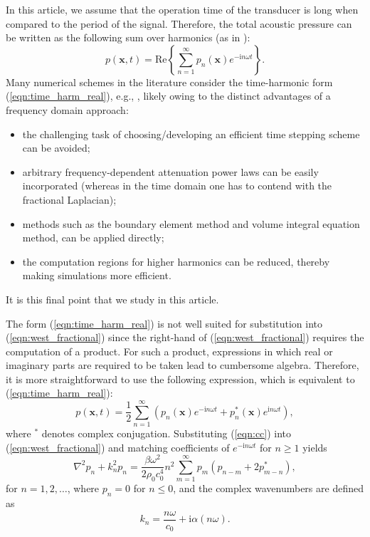 \documentclass[11pt]{article}
\numberwithin{equation}{section}
\newcommand{\bx}{\mathbf{x}}
\newcommand{\red}[1]{{\color{black} #1}}
\begin{document}
In this article, we assume that the operation time of the transducer is long
when compared to the period of the signal. Therefore, the total acoustic 
pressure can be written as the following sum over harmonics 
(as in \cite{du2013fast,soneson2017extending}):
\red{
\begin{equation}
    p(\bx, t) = \text{Re} \left\{\sum_{n=1}^{\infty} 
        p_n(\bx)e^{-\text{i}n\omega t}\right\}.
    \label{eqn:time_harm_real}
\end{equation}
} 
Many numerical schemes in the literature consider the time-harmonic form 
(\ref{eqn:time_harm_real}), e.g., \cite{campos1999finite, du2013fast,soneson2017extending,
van2015fast}, likely owing to the distinct advantages of a frequency domain 
approach:
\begin{itemize}
    \item the challenging task of choosing/developing an efficient time stepping 
    scheme can be avoided; 
    \item arbitrary frequency-dependent attenuation power laws can be easily incorporated
    (whereas in the time domain one has to contend with the fractional Laplacian);
    \item methods such as the boundary element method 
    and volume integral equation method, can be applied directly;
    \item the computation regions for higher harmonics can 
    be reduced, thereby making simulations more efficient.
\end{itemize}
It is this final point that we study in this article.
    
The form (\ref{eqn:time_harm_real}) is not well suited for 
substitution into (\ref{eqn:west_fractional}) 
since the right-hand of (\ref{eqn:west_fractional}) requires the computation of 
a product. For such a product, expressions in which real or imaginary parts are 
required to be taken lead to cumbersome algebra. Therefore, it is more 
straightforward to use the following expression, which is equivalent to 
(\ref{eqn:time_harm_real}):
\begin{equation}
    p(\bx,t) = \frac{1}{2}\sum_{n=1}^{\infty}\left(p_n(\bx)e^{-\text{i}n\omega t} + 
                                       p_n^*(\bx)e^{\text{i}n\omega t}\right),
    \label{eqn:cc}
\end{equation} 
where $^*$ denotes complex conjugation.
Substituting (\ref{eqn:cc}) into (\ref{eqn:west_fractional}) and matching 
coefficients of $e^{-\text{i} n\omega t}$ for $n\geq 1$ yields  
\begin{equation}
    \nabla^2 p_n 
    + k_n^2 p_n = \frac{\beta\omega^2}{2\rho_0 c_0^4}n^2
    \sum_{m=1}^{\infty}p_m(p_{n-m}+2p^*_{m-n}),
    \label{eqn:cascade_1}
\end{equation}
for $n=1,2,\ldots$, where $p_n = 0$ for $n\leq 0$, and the complex wavenumbers are defined as 
\begin{equation}
    k_n = \frac{n\omega}{c_0} + \text{i}\alpha(n\omega).
\end{equation}
    
\end{document}
